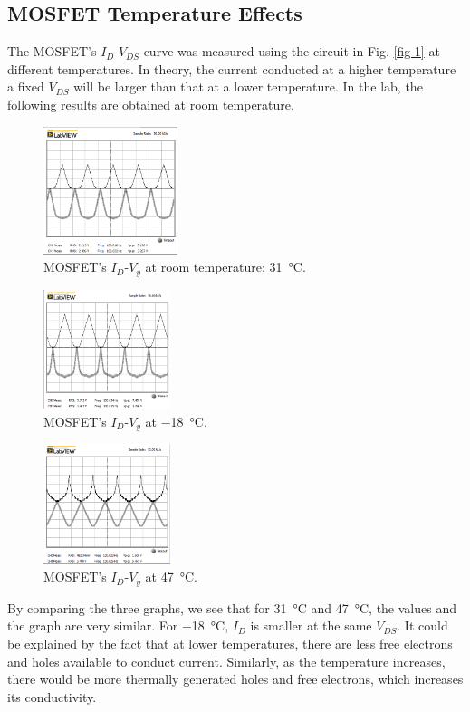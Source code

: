 \documentclass[journal]{IEEEtran}
\begin{document}
\subsection{MOSFET Temperature Effects}
\par The MOSFET’s $I_{D}$-$V_{DS}$ curve was measured using the circuit in Fig. \ref{fig-1}
at different temperatures. In theory, the current conducted at a higher temperature
a fixed $V_{DS}$ will be larger than that at a lower temperature. In the lab, the
following results are obtained at room temperature.
\begin{figure}[h]
  \centering
  \includegraphics[width=0.35\textwidth]{images/2-1.png}
  \caption{MOSFET’s $I_{D}$-$V_{y}$ at room temperature: \SI{31}{\celsius}.}
  \label{fig-5}
\end{figure}
\newpage
\begin{figure}[h]
  \centering
  \includegraphics[width=0.33\textwidth]{images/2-2.png}
  \caption{MOSFET’s $I_{D}$-$V_{y}$ at \SI{-18}{\celsius}.}
  \label{fig-6}
\end{figure}
\begin{figure}[h]
  \centering
  \includegraphics[width=0.33\textwidth]{images/2-3.png}
  \caption{MOSFET’s $I_{D}$-$V_{y}$ at \SI{47}{\celsius}.}
  \label{fig-7}
\end{figure}
\clearpage
\par By comparing the three graphs, we see that for \SI{31}{\celsius} and
\SI{47}{\celsius}, the values and the graph are very similar. For
\SI{-18}{\celsius}, $I_{D}$ is smaller at the same $V_{DS}$. It could be
explained by the fact that at lower temperatures, there are less
free electrons and holes available to conduct current. Similarly,
as the temperature increases, there would be more thermally generated holes
and free electrons, which increases its conductivity.
\end{document}
